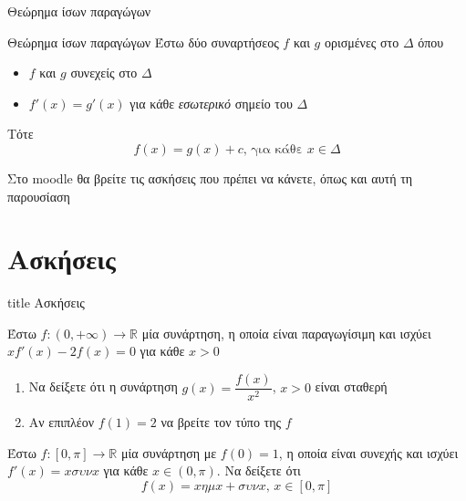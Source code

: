 \documentclass{presentation}
\begin{document}
\begin{frame}{Θεώρημα ίσων παραγώγων}
  \begin{block}{Θεώρημα ίσων παραγώγων}
    Έστω δύο συναρτήσεος $f$ και $g$ ορισμένες στο $Δ$ όπου
    \begin{itemize}
      \item $f$ και $g$ συνεχείς στο $Δ$
      \item $f'(x)=g'(x)$ για κάθε \emph{εσωτερικό} σημείο του $Δ$
    \end{itemize}
    Τότε
    $$f(x)=g(x)+c \text{, για κάθε } x\in Δ$$
  \end{block}
\end{frame}

\begin{frame}
  Στο moodle θα βρείτε τις ασκήσεις που πρέπει να κάνετε, όπως και αυτή τη παρουσίαση
\end{frame}

\section{Ασκήσεις}

\begin{frame}[noframenumbering]
  \vfill
  \centering
  \begin{beamercolorbox}[sep=8pt,center,shadow=true,rounded=true]{title}
    Ασκήσεις
  \end{beamercolorbox}
  \vfill
\end{frame}

\begin{askisi}
  Έστω $f:(0,+\infty)\to\mathbb{R}$ μία συνάρτηση, η οποία είναι παραγωγίσιμη και ισχύει $xf'(x)-2f(x)=0$ για κάθε $x>0$
  \begin{enumerate}[<+->]
    \item Να δείξετε ότι η συνάρτηση $g(x)=\dfrac{f(x)}{x^2}$, $x>0$ είναι σταθερή
    \item Αν επιπλέον $f(1)=2$ να βρείτε τον τύπο της $f$
  \end{enumerate}

\end{askisi}

\begin{askisi}
  Έστω $f:[0,π]\to\mathbb{R}$ μία συνάρτηση με $f(0)=1$, η οποία είναι συνεχής και ισχύει $f'(x)=xσυνx$ για κάθε $x\in (0,π)$. Να δείξετε ότι
  $$f(x)=xημx+συνx \text{, } x\in [0,π]$$

\end{askisi}
\end{document}
